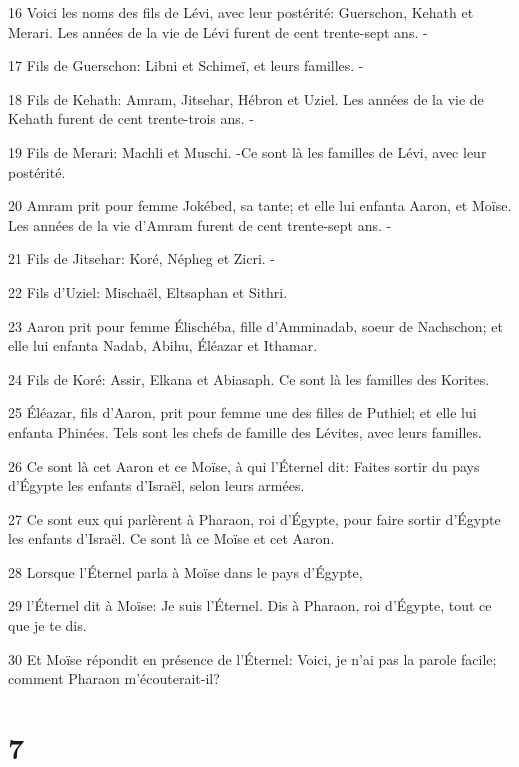 \par 16 Voici les noms des fils de Lévi, avec leur postérité: Guerschon, Kehath et Merari. Les années de la vie de Lévi furent de cent trente-sept ans. -
\par 17 Fils de Guerschon: Libni et Schimeï, et leurs familles. -
\par 18 Fils de Kehath: Amram, Jitsehar, Hébron et Uziel. Les années de la vie de Kehath furent de cent trente-trois ans. -
\par 19 Fils de Merari: Machli et Muschi. -Ce sont là les familles de Lévi, avec leur postérité.
\par 20 Amram prit pour femme Jokébed, sa tante; et elle lui enfanta Aaron, et Moïse. Les années de la vie d'Amram furent de cent trente-sept ans. -
\par 21 Fils de Jitsehar: Koré, Népheg et Zicri. -
\par 22 Fils d'Uziel: Mischaël, Eltsaphan et Sithri.
\par 23 Aaron prit pour femme Élischéba, fille d'Amminadab, soeur de Nachschon; et elle lui enfanta Nadab, Abihu, Éléazar et Ithamar.
\par 24 Fils de Koré: Assir, Elkana et Abiasaph. Ce sont là les familles des Korites.
\par 25 Éléazar, fils d'Aaron, prit pour femme une des filles de Puthiel; et elle lui enfanta Phinées. Tels sont les chefs de famille des Lévites, avec leurs familles.
\par 26 Ce sont là cet Aaron et ce Moïse, à qui l'Éternel dit: Faites sortir du pays d'Égypte les enfants d'Israël, selon leurs armées.
\par 27 Ce sont eux qui parlèrent à Pharaon, roi d'Égypte, pour faire sortir d'Égypte les enfants d'Israël. Ce sont là ce Moïse et cet Aaron.
\par 28 Lorsque l'Éternel parla à Moïse dans le pays d'Égypte,
\par 29 l'Éternel dit à Moïse: Je suis l'Éternel. Dis à Pharaon, roi d'Égypte, tout ce que je te dis.
\par 30 Et Moïse répondit en présence de l'Éternel: Voici, je n'ai pas la parole facile; comment Pharaon m'écouterait-il?

\chapter{7}


